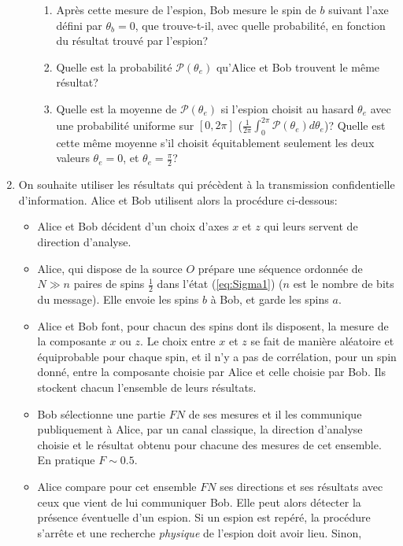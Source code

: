 \begin{enumerate}
\begin{enumerate}
\begin{enumerate}
\item Après cette mesure de l'espion, Bob mesure le spin de $b$ suivant l'axe
défini par $\theta_b=0$, que trouve-t-il, avec quelle probabilité, en fonction
du résultat trouvé par l'espion?

\item Quelle est la probabilité $\mathcal{P}(\theta_e)$ qu'Alice et Bob
trouvent le même résultat?

\item Quelle est la moyenne de $\mathcal{P}(\theta_e)$ si l'espion
 choisit au hasard $\theta_e$ avec une probabilité uniforme sur $[0,2\pi]$
($\frac{1}{2\pi}\int_0^{2\pi}\mathcal{P}(\theta_e)d\theta_e$)? Quelle est cette
même moyenne s'il choisit équitablement seulement les deux valeurs
$\theta_e=0$, et $\theta_e=\frac{\pi}{2}$?
\end{enumerate}
\end{enumerate}

\item On souhaite utiliser les résultats qui précèdent à la transmission
confidentielle d'information. Alice et Bob utilisent alors la procédure
ci-dessous:
{\small
\begin{itemize}
 \item Alice et Bob décident d'un choix d'axes $x$ et $z$ qui leurs servent de
direction d'analyse.

\item Alice, qui dispose de la source $O$ prépare une séquence ordonnée de
$N\gg n$ paires de spins $\frac{1}{2}$ dans l'état (\ref{eq:Sigma1}) ($n$ est
le nombre de bits du message). Elle envoie les spins $b$ à Bob, et garde les
spins $a$.

\item Alice et Bob font, pour chacun des spins dont ils disposent, la mesure de
la composante $x$ ou $z$. Le choix entre $x$ et $z$ se fait de manière
aléatoire et équiprobable pour chaque spin, et il n'y a pas de corrélation,
pour un spin donné, entre la composante choisie par Alice et celle choisie par
Bob. Ils stockent chacun l'ensemble de leurs résultats.

\item Bob sélectionne une partie $FN$ de ses mesures et il les communique
publiquement à Alice, par un canal classique, la direction d'analyse choisie et
le résultat obtenu pour chacune des mesures de cet ensemble. En pratique
$F\sim0.5$.

\item Alice compare pour cet ensemble $FN$ ses directions et ses résultats avec
ceux que vient de lui communiquer Bob. Elle peut alors détecter la présence
éventuelle d'un espion. Si un espion est repéré, la procédure s'arrête et une
recherche \emph{physique} de l'espion doit avoir lieu. Sinon,


\end{itemize}}
\end{enumerate}
